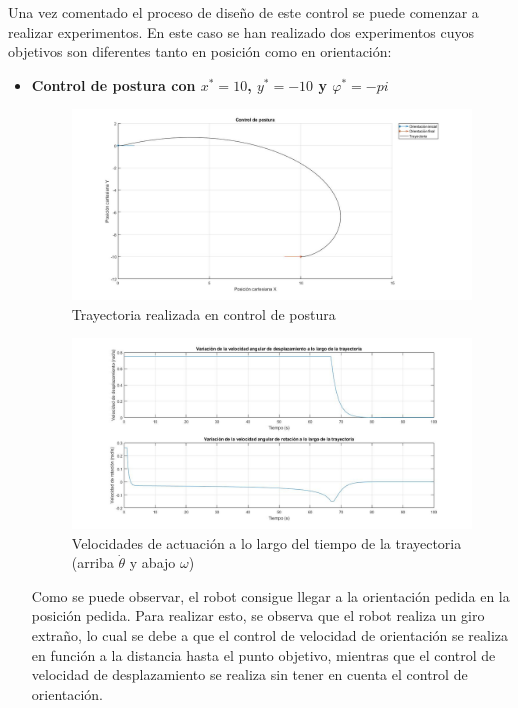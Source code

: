 \documentclass[a4paper,twoside]{article}
\begin{document}
	Una vez comentado el proceso de diseño de este control se puede comenzar a realizar experimentos. En este caso se han realizado dos experimentos cuyos objetivos son diferentes tanto en posición como en orientación:
	\newpage
	\begin{itemize}
		\item \textbf{Control de postura con $x^*=10$, $y^*=-10$ y $\varphi^*=-pi$}
		\begin{figure}[H]
			\centering
			\includegraphics[width=1\textwidth]{control_postura_1}
			\caption{Trayectoria realizada en control de postura}
		\end{figure}
		\begin{figure}[H]
			\centering
			\includegraphics[width=1\textwidth]{control_postura_1_2}
			\caption{Velocidades de actuación a lo largo del tiempo de la trayectoria (arriba $\dot{\theta}$ y abajo $\omega$)}
		\end{figure}
		Como se puede observar, el robot consigue llegar a la orientación pedida en la posición pedida. Para realizar esto, se observa que el robot realiza un giro extraño, lo cual se debe a que el control de velocidad de orientación se realiza en función a la distancia hasta el punto objetivo, mientras que el control de velocidad de desplazamiento se realiza sin tener en cuenta el control de orientación.\\

\end{itemize}
\end{document}
